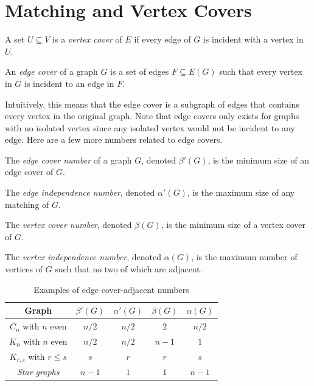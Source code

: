 \section{Matching and Vertex Covers}

\begin{definition}
  A set \(U \subseteq V\) is a \textit{vertex cover} of \(E\) if
  every edge of \(G\) is incident with a vertex in \(U\).
\end{definition}

\begin{definition}
  An \textit{edge cover} of a graph \(G\) is a set of edges \(F
  \subseteq E(G)\) such that every vertex in \(G\) is 
  incident to an edge in \(F\).
\end{definition}

Intuitively, this means that the edge cover is a subgraph of edges that contains
every vertex in the original graph. Note that edge covers only exists for 
graphs with no isolated vertex since any isolated vertex would not be incident 
to any edge. Here are a few more numbers related to edge covers.

\begin{definition}
  The \textit{edge cover number} of a graph \(G\), denoted 
  \(\beta'(G)\), is the minimum size of an edge cover of \(G\).
\end{definition}

\begin{definition}
  The \textit{edge independence number}, denoted \(\alpha'(G)\),
  is the maximum size of any matching of \(G\). 
\end{definition}

\begin{definition}
  The \textit{vertex cover number}, denoted \(\beta(G)\), is the
  minimum size of a vertex cover of \(G\).
\end{definition}

\begin{definition}
  The \textit{vertex independence number}, denoted \(\alpha(G)\),
  is the maximum number of vertices of \(G\) such that no two of
  which are adjacent.
\end{definition}

\begin{table}[h]
  \centering
  \caption{Examples of edge cover-adjacent numbers}
  \begin{tabular}{|c|c|c|c|c|}
    \toprule
    Graph & \(\beta'(G)\) & \(\alpha'(G)\) & \(\beta(G)\) & \(\alpha(G)\) \\
    \midrule
    \(C_{n}\) with \(n\) even & \(n/2\) & \(n/2\) & \(2\) & \(n/2\) \\
    \(K_n\) with \(n\) even & \(n/2\) & \(n/2\) & \(n-1\) & \(1\) \\
    \(K_{r,s}\) with \(r \leq s\) & \(s\) & \(r\) & \(r\) & \(s\) \\
    \textit{Star graphs} & \(n-1\) & \(1\) & \(1\) & \(n-1\) \\
    \bottomrule
  \end{tabular}
\end{table}


